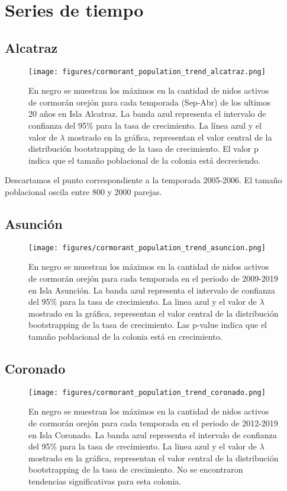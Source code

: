 \documentclass{article} %
\begin{document}
\section*{Series de tiempo}

\subsection*{Alcatraz}

\begin{figure}[H]
\hspace{-2cm}
    \texttt{[image: figures/cormorant\_population\_trend\_alcatraz.png]}
\caption{En negro se muestran los máximos en la cantidad de nidos activos de cormorán orejón para cada temporada (Sep-Abr) de los ultimos 20 años en Isla Alcatraz. La banda azul representa el intervalo de confianza del 95\% para la tasa de crecimiento. La línea azul y el valor de $\lambda$ mostrado en la gráfica, representan el valor central de la distribución bootstrapping de la tasa de crecimiento. El valor p indica que el tamaño poblacional de la colonia está decreciendo.}
\end{figure}

Descartamos el punto correspondiente a la temporada 2005-2006. El tamaño poblacional oscila entre 800 y 2000 parejas. 

\subsection*{Asunción}

\begin{figure}[H]
\hspace{-2cm}
    \texttt{[image: figures/cormorant\_population\_trend\_asuncion.png]}
\caption{En negro se muestran los máximos en la cantidad de nidos activos de cormorán orejón para cada temporada en el periodo de 2009-2019 en Isla Asunción. La banda azul representa el intervalo de confianza del 95\% para la tasa de crecimiento. La linea azul y el valor de $\lambda$ mostrado en la gráfica, representan el valor central de la distribución bootstrapping de la tasa de crecimiento. Las p-value indica que el tamaño poblacional de la colonia está en crecimiento.}
\end{figure}

\subsection*{Coronado}

\begin{figure}[H]
\hspace{-2cm}
    \texttt{[image: figures/cormorant\_population\_trend\_coronado.png]}
\caption{En negro se muestran los máximos en la cantidad de nidos activos de cormorán orejón para cada temporada en el periodo de 2012-2019 en Isla Coronado. La banda azul representa el intervalo de confianza del 95\% para la tasa de crecimiento. La linea azul y el valor de $\lambda$ mostrado en la gráfica, representan el valor central de la distribución bootstrapping de la tasa de crecimiento. No se encontraron tendencias significativas para esta colonia.}
\end{figure}
\end{document}
